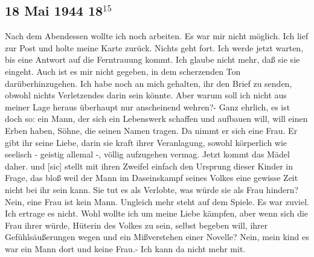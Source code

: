 \subsection{18 Mai 1944 18$^{15}$}

Nach dem Abendessen wollte ich noch arbeiten.
Es war mir nicht m\"{o}glich.
Ich lief zur Post und holte meine Karte zur\"{u}ck.
Nichts geht fort.
Ich werde jetzt warten, bis eine Antwort auf die Ferntrauung kommt.
Ich glaube nicht mehr, da{\ss} sie sie eingeht.
Auch ist es mir nicht gegeben, in dem scherzenden Ton dar\"{u}berhinzugehen.
Ich habe noch an mich gehalten, ihr den Brief zu senden, obwohl nichts Verletzendes darin sein k\"{o}nnte.
Aber warum soll ich nicht aus meiner Lage heraus \"{u}berhaupt nur anscheinend wehren?-
Ganz ehrlich, es ist doch so: ein Mann, der sich ein Lebenswerk schaffen und aufbauen will, will einen Erben haben, S\"{o}hne, die seinen Namen tragen.
Da nimmt er sich eine Frau.
Er gibt ihr seine Liebe, darin sie kraft ihrer Veranlagung, sowohl k\"{o}rperlich wie seelisch - geistig allemal -, v\"{o}llig aufzugehen vermag.
Jetzt kommt das M\"{a}del daher.
und{\color{red} [sic] } stellt mit ihren Zweifel einfach den Ursprung dieser Kinder in Frage, das blo{\ss} weil der Mann im Daseinskampf seines Volkes eine gewisse Zeit nicht bei ihr sein kann.
Sie tut es als Verlobte, was w\"{u}rde sie als Frau hindern?
Nein, eine Frau ist kein Mann.
Ungleich mehr steht auf dem Spiele.
Es war zuviel.
Ich ertrage es nicht.
Wohl wollte ich um meine Liebe k\"{a}mpfen, aber wenn sich die Frau ihrer w\"{u}rde, H\"{u}terin des Volkes zu sein, selbst begeben will, ihrer Gef\"{u}hls\"{a}u{\ss}erungen wegen und ein Mi{\ss}verstehen einer Novelle?
Nein, mein kind es war ein Mann dort und keine Frau.-
Ich kann da nicht mehr mit.

\clearpage
